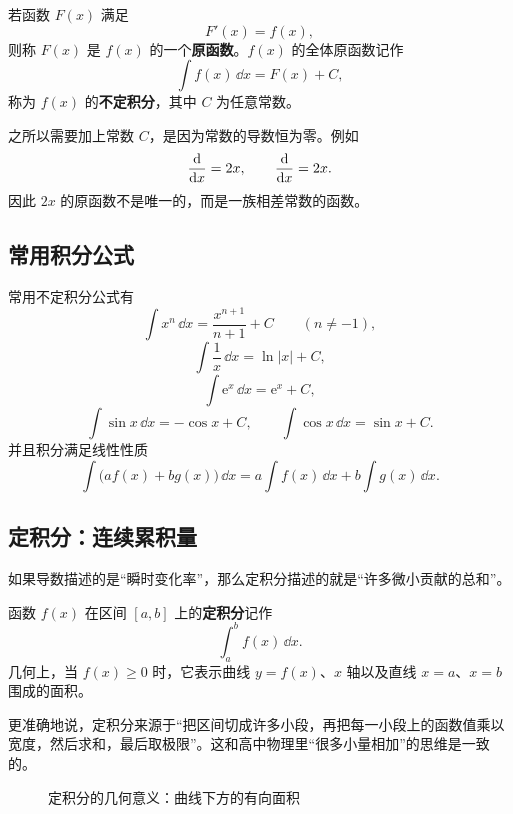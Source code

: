 \begin{definition}
若函数 $F(x)$ 满足
\[
  F'(x) = f(x),
\]
则称 $F(x)$ 是 $f(x)$ 的一个\textbf{原函数}。$f(x)$ 的全体原函数记作
\[
  \int f(x)\,\dd x = F(x) + C,
\]
称为 $f(x)$ 的\textbf{不定积分}，其中 $C$ 为任意常数。
\end{definition}

之所以需要加上常数 $C$，是因为常数的导数恒为零。例如
\[
  \dv{}{x}(x^2+3)=2x, \qquad \dv{}{x}(x^2-100)=2x.
\]
因此 $2x$ 的原函数不是唯一的，而是一族相差常数的函数。

\subsection{常用积分公式}

\begin{theorem}
常用不定积分公式有
\[
  \int x^n\,\dd x = \frac{x^{n+1}}{n+1}+C \qquad (n\ne -1),
\]
\[
  \int \frac{1}{x}\,\dd x = \ln|x| + C,
\]
\[
  \int \mathrm{e}^x\,\dd x = \mathrm{e}^x + C,
\]
\[
  \int \sin x\,\dd x = -\cos x + C,
  \qquad
  \int \cos x\,\dd x = \sin x + C.
\]
并且积分满足线性性质
\[
  \int \bigl(af(x)+bg(x)\bigr)\,\dd x
  = a\int f(x)\,\dd x + b\int g(x)\,\dd x.
\]
\end{theorem}

\subsection{定积分：连续累积量}

如果导数描述的是“瞬时变化率”，那么定积分描述的就是“许多微小贡献的总和”。

\begin{definition}
函数 $f(x)$ 在区间 $[a,b]$ 上的\textbf{定积分}记作
\[
  \int_a^b f(x)\,\dd x.
\]
几何上，当 $f(x)\ge 0$ 时，它表示曲线 $y=f(x)$、$x$ 轴以及直线 $x=a$、$x=b$ 围成的面积。
\end{definition}

更准确地说，定积分来源于“把区间切成许多小段，再把每一小段上的函数值乘以宽度，然后求和，最后取极限”。这和高中物理里“很多小量相加”的思维是一致的。

\begin{figure}[H]
  \centering
  \caption{定积分的几何意义：曲线下方的有向面积}
\end{figure}

